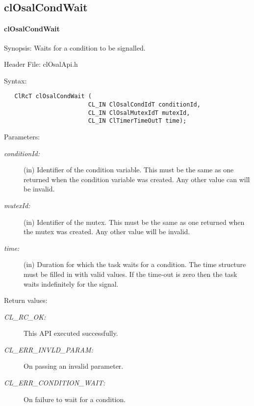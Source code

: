 \subsection{clOsalCondWait}
\hypertarget{pageosal120}{}\paragraph{cl\-Osal\-Cond\-Wait}\label{pageosal120}
\begin{Desc}
\item[Synopsis:]Waits for a condition to be signalled.\end{Desc}
\begin{Desc}
\item[Header File:]clOsalApi.h\end{Desc}
\begin{Desc}
\item[Syntax:]

\footnotesize\begin{verbatim}   ClRcT clOsalCondWait (
                        CL_IN ClOsalCondIdT conditionId,
                        CL_IN ClOsalMutexIdT mutexId,
                        CL_IN ClTimerTimeOutT time);
\end{verbatim}
\normalsize
\end{Desc}
\begin{Desc}
\item[Parameters:]
\begin{description}
\item[{\em condition\-Id:}](in) Identifier of the condition variable. This must be the same as one returned when the condition variable was created. 
Any other value can will be invalid.\item[{\em mutex\-Id:}](in) Identifier of the mutex. This must be the same as one returned when the mutex was created.
Any other value will be invalid.\item[{\em time:}](in) Duration for which the task waits for a condition. The time structure must be filled in with valid values. If the time-out is zero then the task waits indefinitely for the signal.\end{description}
\end{Desc}
\begin{Desc}
\item[Return values:]
\begin{description}
\item[{\em CL\_\-RC\_\-OK:}]This API executed successfully. \item[{\em CL\_\-ERR\_\-INVLD\_\-PARAM:}]On passing an invalid parameter. \item[{\em CL\_\-ERR\_\-CONDITION\_\-WAIT:}]On failure to wait for a condition.\end{description}
\end{Desc}

